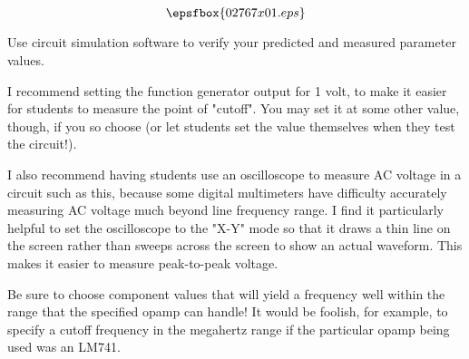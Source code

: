 

$$\epsfbox{02767x01.eps}$$

\vfil \eject






Use circuit simulation software to verify your predicted and measured parameter values.







I recommend setting the function generator output for 1 volt, to make it easier for students to measure the point of "cutoff".  You may set it at some other value, though, if you so choose (or let students set the value themselves when they test the circuit!).

I also recommend having students use an oscilloscope to measure AC voltage in a circuit such as this, because some digital multimeters have difficulty accurately measuring AC voltage much beyond line frequency range.  I find it particularly helpful to set the oscilloscope to the "X-Y" mode so that it draws a thin line on the screen rather than sweeps across the screen to show an actual waveform.  This makes it easier to measure peak-to-peak voltage.

Be sure to choose component values that will yield a frequency well within the range that the specified opamp can handle!  It would be foolish, for example, to specify a cutoff frequency in the megahertz range if the particular opamp being used was an LM741.




